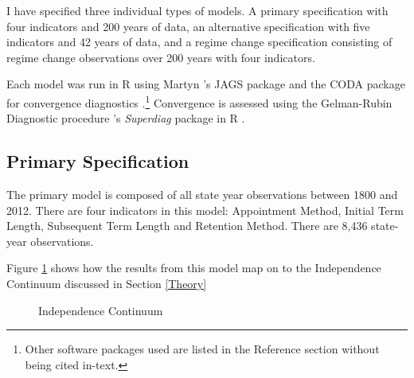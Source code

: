 \documentclass[JohnsonMADraft3]{subfiles}
\begin{document}
\doublespacing

I have specified three individual types of models.  A primary specification with four indicators and 200 years of data, an alternative specification with five indicators and 42 years of data, and a regime change specification consisting of regime change observations over 200 years with four indicators.

Each model was run in R using Martyn \citeauthor{r-rjags}'s JAGS package and the CODA package for convergence diagnostics \cite{R,r-CODA}.\footnote{Other software packages used are listed in the Reference section without being cited in-text.}\nocite{R,r-CODA,r-Foreign,r-R2jags,r-ggplot2,r-dplyr,r-rjagsr-doParallel,r-rcurl,r-random,r-superdiag}  Convergence is assessed using the Gelman-Rubin Diagnostic procedure \citeauthor{r-superdiag}'s \textit{Superdiag} package in R \citep{Gelman1992,R}.

\subsection{Primary Specification}
The primary model is composed of all state year observations between 1800 and 2012.  There are four indicators in this model: Appointment Method, Initial Term Length, Subsequent Term Length and Retention Method.  There are 8,436 state-year observations.  

Figure \ref{continuumresults} shows how the results from this model map on to the Independence Continuum discussed in Section \ref{Theory}

\begin{figure}[tbh]\centering\caption{Independence Continuum}\label{continuumresults}
\end{figure} 
\end{document}
